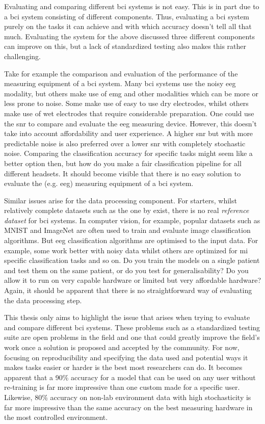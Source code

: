 
Evaluating and comparing different \gls{bci} systems is not easy.
This is in part due to a \gls{bci} system consisting of different components.
Thus, evaluating a \gls{bci} system purely on the tasks it can achieve and with which accuracy doesn't tell all that much.
Evaluating the system for the above discussed three different components can improve on this, but a lack of standardized testing also makes this rather challenging.

Take for example the comparison and evaluation of the performance of the measuring equipment of a \gls{bci} system.
Many \gls{bci} systems use the noisy \gls{eeg} modality, but others make use of \gls{emg} and other modalities which can be more or less prone to noise. 
Some make use of easy to use dry electrodes, whilst others make use of wet electrodes that require considerable preparation.
One could use the \gls{snr} to compare and evaluate the \gls{eeg} measuring device.
However, this doesn't take into account affordability and user experience.
A higher \gls{snr} but with more predictable noise is also preferred over a lower \gls{snr} with completely stochastic noise.
Comparing the classification accuracy for specific tasks might seem like a better option then, but how do you make a fair classification pipeline for all different headsets.
It should become visible that there is no easy solution to evaluate the (e.g. \gls{eeg}) measuring equipment of a \gls{bci} system.

Similar issues arise for the data processing component.
For starters, whilst relatively complete datasets such as the one by \citet{eeg_data} exist, there is no real \textit{reference dataset} for \gls{bci} systems.
In computer vision, for example, popular datasets such as MNIST \citep{mnist} and ImageNet \citep{imagenet} are often used to train and evaluate image classification algorithms.
But \gls{eeg} classification algorithms are optimised to the input data.
For example, some work better with noisy data whilst others are optimized for \gls{mi} specific classification tasks and so on.
Do you train the models on a single patient and test them on the same patient, or do you test for generalisability?
Do you allow it to run on very capable hardware or limited but very affordable hardware?
Again, it should be apparent that there is no straightforward way of evaluating the data processing step. 

This thesis only aims to highlight the issue that arises when trying to evaluate and compare different \gls{bci} systems.
These problems such as a standardized testing suite are open problems in the field and one that could greatly improve the field's work once a solution is proposed and accepted by the community.
For now, focusing on reproducibility and specifying the data used and potential ways it makes tasks easier or harder is the best most researchers can do.
It becomes apparent that a 90\% accuracy for a model that can be used on any user without re-training is far more impressive than one custom made for a specific user.
Likewise, 80\% accuracy on non-lab environment data with high stochasticity is far more impressive than the same accuracy on the best measuring hardware in the most controlled environment. 

